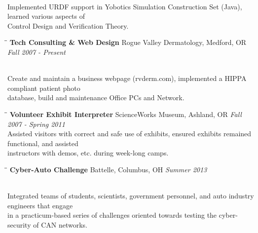 \documentclass{res}
\begin{document}
\begin{resume}
\begin{tabbing}
				\\ Implemented URDF support in Yobotics Simulation Construction Set (Java), learned various aspects of \\Control Design and Verification Theory.

			\end{tabbing}\vspace{-20pt}

			\begin{tabbing}
				\hspace{2.3in}\= \hspace{2.6in}\= \kill %
				{\bf Tech Consulting \& Web Design}	\>Rogue Valley Dermatology, Medford, OR	\> \textit{Fall 2007 - Present}

				\\Create and maintain a business webpage (rvderm.com), implemented a HIPPA compliant patient photo \\database, build and maintenance Office PCs and Network.

			\end{tabbing}\vspace{-20pt}

			\begin{tabbing}
				\hspace{2.3in}\= \hspace{2.6in}\= \kill %
				{\bf Volunteer Exhibit Interpreter}	\>ScienceWorks Museum, Ashland, OR	\> \textit{Fall 2007 - Spring 2011}
				\\Assisted visitors with correct and safe use of exhibits, ensured exhibits remained functional, and assisted \\instructors with demos, etc. during week-long camps.

			\end{tabbing}\vspace{-20pt}

			\begin{tabbing}
				\hspace{2.3in}\= \hspace{2.6in}\= \kill %
				{\bf Cyber-Auto Challenge}	\>Battelle, Columbus, OH	\> \textit{Summer 2013}

\\Integrated teams of students, scientists, government personnel, and auto industry engineers that engage\\in a practicum-based series of challenges oriented towards testing the cyber-security of CAN networks. 
			\end{tabbing}\vspace{-20pt}


\end{resume}
\end{document}
